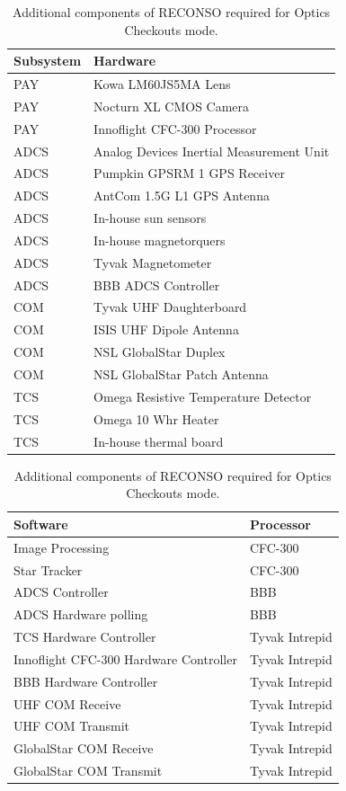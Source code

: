 \documentclass{article}
\begin{document}
\begin{table}[h!]
\caption{Additional components of RECONSO required for Optics Checkouts mode.}
\begin{adjustbox}{center}
\begin{tabular}{|l|l|}
\hline
Subsystem & Hardware \\ \hline \hline
PAY & Kowa LM60JS5MA Lens  \\ \hline
PAY & Nocturn XL CMOS Camera  \\ \hline
PAY & Innoflight CFC-300 Processor  \\ \hline \hline
ADCS & Analog Devices Inertial Measurement Unit  \\ \hline
ADCS & Pumpkin GPSRM 1 GPS Receiver \\ \hline
ADCS & AntCom 1.5G L1 GPS Antenna  \\ \hline
ADCS & In-house sun sensors  \\ \hline
ADCS & In-house magnetorquers  \\ \hline
ADCS & Tyvak Magnetometer \\ \hline
ADCS & BBB ADCS Controller \\ \hline \hline
COM & Tyvak UHF Daughterboard  \\ \hline
COM & ISIS UHF Dipole Antenna  \\ \hline
COM & NSL GlobalStar Duplex  \\ \hline
COM & NSL GlobalStar Patch Antenna \\ \hline \hline
TCS & Omega Resistive Temperature Detector \\ \hline
TCS & Omega 10 Whr Heater  \\ \hline
TCS & In-house thermal board \\ \hline
\end{tabular}

\quad

\begin{tabular}{|l|l|}
\hline
Software & Processor \\ \hline \hline
Image Processing & CFC-300 \\ \hline
Star Tracker & CFC-300 \\ \hline
ADCS Controller & BBB \\ \hline
ADCS Hardware polling & BBB \\ \hline \hline
TCS Hardware Controller & Tyvak Intrepid \\ \hline
Innoflight CFC-300 Hardware Controller & Tyvak Intrepid \\ \hline
BBB Hardware Controller & Tyvak Intrepid \\ \hline
UHF COM Receive & Tyvak Intrepid \\ \hline
UHF COM Transmit & Tyvak Intrepid \\ \hline
GlobalStar COM Receive & Tyvak Intrepid \\ \hline
GlobalStar COM Transmit & Tyvak Intrepid \\ \hline
\end{tabular}
\end{adjustbox}
\end{table}
\end{document}
